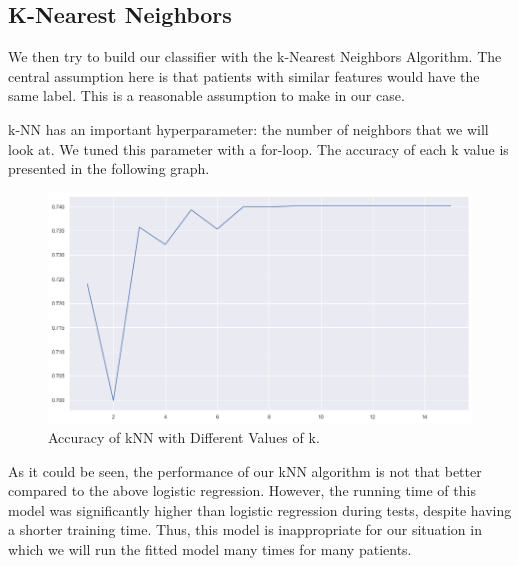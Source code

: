 \documentclass[a4paper]{article}
\begin{document}
\subsection*{K-Nearest Neighbors}
We then try to build our classifier with the k-Nearest Neighbors Algorithm. The central assumption here is that patients with similar features would have the same label. This is a reasonable assumption to make in our case.\par
k-NN has an important hyperparameter: the number of neighbors that we will look at. We tuned this parameter with a for-loop. The accuracy of each k value is presented in the following graph.
\begin{figure}[H]
\centering
\includegraphics[scale=0.265]{knn.png}
\caption{Accuracy of kNN with Different Values of k.}
\label{COnfirmed Cases}
\end{figure}
As it could be seen, the performance of our kNN algorithm is not that better compared to the above logistic regression. However, the running time of this model was significantly higher than logistic regression during tests, despite having a shorter training time. Thus, this model is inappropriate for our situation in which we will run the fitted model many times for many patients.
\end{document}
